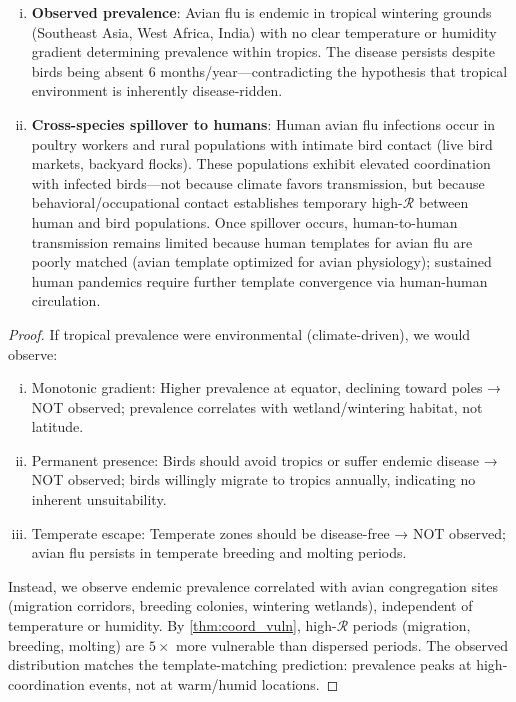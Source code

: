 \documentclass[11pt,twocolumn,a4paper]{article}
\newcommand{\Coord}{\mathcal{R}}
\begin{document}
\begin{theorem}
\begin{enumerate}[(i)]
\item \textbf{Observed prevalence}: Avian flu is endemic in tropical wintering grounds (Southeast Asia, West Africa, India) with no clear temperature or humidity gradient determining prevalence within tropics. The disease persists despite birds being absent 6 months/year—contradicting the hypothesis that tropical environment is inherently disease-ridden.

\item \textbf{Cross-species spillover to humans}: Human avian flu infections occur in poultry workers and rural populations with intimate bird contact (live bird markets, backyard flocks). These populations exhibit elevated coordination with infected birds—not because climate favors transmission, but because behavioral/occupational contact establishes temporary high-$\Coord$ between human and bird populations. Once spillover occurs, human-to-human transmission remains limited because human templates for avian flu are poorly matched (avian template optimized for avian physiology); sustained human pandemics require further template convergence via human-human circulation.
\end{enumerate}
\end{theorem}

\begin{proof}
If tropical prevalence were environmental (climate-driven), we would observe:
\begin{enumerate}[(i)]
\item Monotonic gradient: Higher prevalence at equator, declining toward poles → NOT observed; prevalence correlates with wetland/wintering habitat, not latitude.
\item Permanent presence: Birds should avoid tropics or suffer endemic disease → NOT observed; birds willingly migrate to tropics annually, indicating no inherent unsuitability.
\item Temperate escape: Temperate zones should be disease-free → NOT observed; avian flu persists in temperate breeding and molting periods.
\end{enumerate}
Instead, we observe endemic prevalence correlated with avian congregation sites (migration corridors, breeding colonies, wintering wetlands), independent of temperature or humidity. By \cref{thm:coord_vuln}, high-$\Coord$ periods (migration, breeding, molting) are $5\times$ more vulnerable than dispersed periods. The observed distribution matches the template-matching prediction: prevalence peaks at high-coordination events, not at warm/humid locations.
\end{proof}
\end{document}
